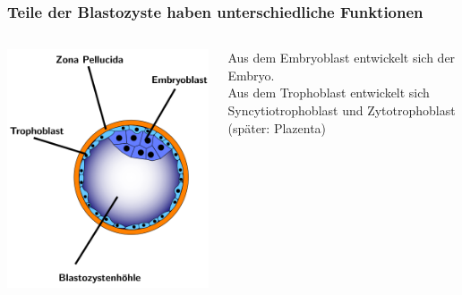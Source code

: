\documentclass{beamer}
\begin{document}
\begin{frame}
\frametitle{Teile der Blastozyste haben unterschiedliche Funktionen}

\begin{columns}[c]

\begin{column}{5cm}
\begin{center}
    \includegraphics[width=\textwidth]{Blastozyste.png}
\end{center}
\end{column}

\begin{column}{5cm}

Aus dem Embryoblast entwickelt sich der Embryo. \\[0.2 cm]

Aus dem Trophoblast entwickelt sich Syncytiotrophoblast und Zytotrophoblast (später: Plazenta)

\end{column}

\end{columns}

\end{frame}
\end{document}
